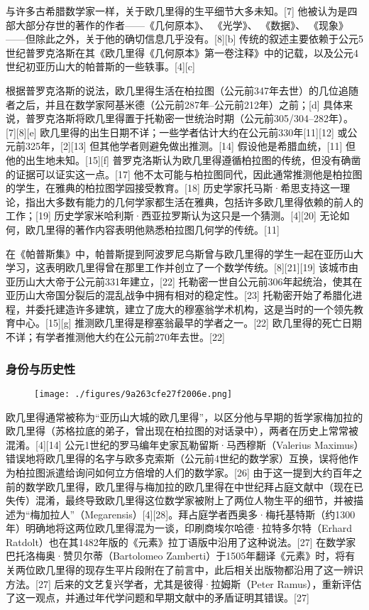 与许多古希腊数学家一样，关于欧几里得的生平细节大多未知。[7] 他被认为是四部大部分存世的著作的作者——《几何原本》、 《光学》、 《数据》、 《现象》——但除此之外，关于他的确切信息几乎没有。[8][b] 传统的叙述主要依赖于公元5世纪普罗克洛斯在其《欧几里得《几何原本》第一卷注释》中的记载，以及公元4世纪初亚历山大的帕普斯的一些轶事。[4][c]

根据普罗克洛斯的说法，欧几里得生活在柏拉图（公元前347年去世）的几位追随者之后，并且在数学家阿基米德（公元前287年–公元前212年）之前；[d] 具体来说，普罗克洛斯将欧几里得置于托勒密一世统治时期（公元前305/304–282年）。[7][8][e] 欧几里得的出生日期不详；一些学者估计大约在公元前330年[11][12] 或公元前325年，[2][13] 但其他学者则避免做出推测。[14] 假设他是希腊血统，[11] 但他的出生地未知。[15][f] 普罗克洛斯认为欧几里得遵循柏拉图的传统，但没有确凿的证据可以证实这一点。[17] 他不太可能与柏拉图同代，因此通常推测他是柏拉图的学生，在雅典的柏拉图学园接受教育。[18] 历史学家托马斯·希思支持这一理论，指出大多数有能力的几何学家都生活在雅典，包括许多欧几里得依赖的前人的工作；[19] 历史学家米哈利斯·西亚拉罗斯认为这只是一个猜测。[4][20] 无论如何，欧几里得的著作内容表明他熟悉柏拉图几何学的传统。[11]

在《帕普斯集》中，帕普斯提到阿波罗尼乌斯曾与欧几里得的学生一起在亚历山大学习，这表明欧几里得曾在那里工作并创立了一个数学传统。[8][21][19] 该城市由亚历山大大帝于公元前331年建立，[22] 托勒密一世自公元前306年起统治，使其在亚历山大帝国分裂后的混乱战争中拥有相对的稳定性。[23] 托勒密开始了希腊化进程，并委托建造许多建筑，建立了庞大的穆塞翁学术机构，这是当时的一个领先教育中心。[15][g] 推测欧几里得是穆塞翁最早的学者之一。[22] 欧几里得的死亡日期不详；有学者推测他大约在公元前270年去世。[22]
\subsubsection{身份与历史性}
\begin{figure}[ht]
\centering
\texttt{[image: ./figures/9a263cfe27f2006e.png]}
\caption{} \label{fig_Euclid_3}
\end{figure}
欧几里得通常被称为“亚历山大城的欧几里得”，以区分他与早期的哲学家梅加拉的欧几里得（苏格拉底的弟子，曾出现在柏拉图的对话录中），两者在历史上常常被混淆。[4][14] 公元1世纪的罗马编年史家瓦勒留斯·马西穆斯（Valerius Maximus）错误地将欧几里得的名字与欧多克索斯（公元前4世纪的数学家）互换，误将他作为柏拉图派遣给询问如何立方倍增的人们的数学家。[26] 由于这一提到大约百年之前的数学欧几里得，欧几里得与梅加拉的欧几里得在中世纪拜占庭文献中（现在已失传）混淆，最终导致欧几里得这位数学家被附上了两位人物生平的细节，并被描述为“梅加拉人”（Megarensis）[4][28]。拜占庭学者西奥多·梅托基特斯（约1300年）明确地将这两位欧几里得混为一谈，印刷商埃尔哈德·拉特多尔特（Erhard Ratdolt）也在其1482年版的《元素》拉丁语版中沿用了这种说法。[27] 在数学家巴托洛梅奥·赞贝尔蒂（Bartolomeo Zamberti）于1505年翻译《元素》时，将有关两位欧几里得的现存生平片段附在了前言中，此后相关出版物都沿用了这一辨识方法。[27] 后来的文艺复兴学者，尤其是彼得·拉姆斯（Peter Ramus），重新评估了这一观点，并通过年代学问题和早期文献中的矛盾证明其错误。[27]


